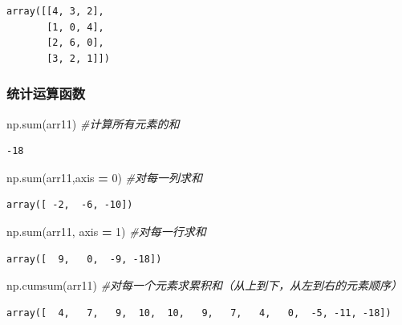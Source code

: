 \documentclass[]{article}
\newenvironment{Shaded}{\begin{snugshade}}{\end{snugshade}}
\newcommand{\DecValTok}[1]{\textcolor[rgb]{0.00,0.00,0.81}{#1}}
\newcommand{\CommentTok}[1]{\textcolor[rgb]{0.56,0.35,0.01}{\textit{#1}}}
\newcommand{\OperatorTok}[1]{\textcolor[rgb]{0.81,0.36,0.00}{\textbf{#1}}}
\newcommand{\BuiltInTok}[1]{#1}
\newcommand{\NormalTok}[1]{#1}
\begin{document}
\begin{verbatim}
array([[4, 3, 2],
       [1, 0, 4],
       [2, 6, 0],
       [3, 2, 1]])
\end{verbatim}

\subsubsection{统计运算函数}

\begin{Shaded}
\begin{Highlighting}[]
\NormalTok{np.}\BuiltInTok{sum}\NormalTok{(arr11) }\CommentTok{#计算所有元素的和}
\end{Highlighting}
\end{Shaded}

\begin{verbatim}
-18
\end{verbatim}

\begin{Shaded}
\begin{Highlighting}[]
\NormalTok{np.}\BuiltInTok{sum}\NormalTok{(arr11,axis }\OperatorTok{=} \DecValTok{0}\NormalTok{) }\CommentTok{#对每一列求和}
\end{Highlighting}
\end{Shaded}

\begin{verbatim}
array([ -2,  -6, -10])
\end{verbatim}

\begin{Shaded}
\begin{Highlighting}[]
\NormalTok{np.}\BuiltInTok{sum}\NormalTok{(arr11, axis }\OperatorTok{=} \DecValTok{1}\NormalTok{) }\CommentTok{#对每一行求和}
\end{Highlighting}
\end{Shaded}

\begin{verbatim}
array([  9,   0,  -9, -18])
\end{verbatim}

\begin{Shaded}
\begin{Highlighting}[]
\NormalTok{np.cumsum(arr11) }\CommentTok{#对每一个元素求累积和（从上到下，从左到右的元素顺序）}
\end{Highlighting}
\end{Shaded}

\begin{verbatim}
array([  4,   7,   9,  10,  10,   9,   7,   4,   0,  -5, -11, -18])
\end{verbatim}
\end{document}

